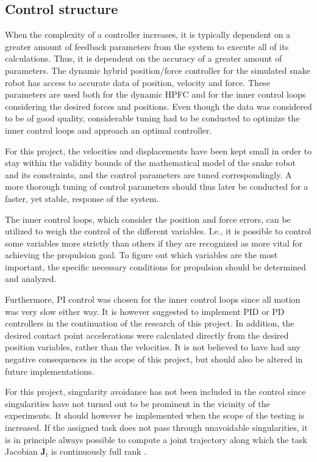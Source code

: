 \subsection{Control structure}

When the complexity of a controller increases, it is typically dependent on a greater amount of feedback parameters from the system to execute all of its calculations. Thus, it is dependent on the accuracy of a greater amount of parameters. The dynamic hybrid position/force controller for the simulated snake robot has access to accurate data of position, velocity and force. These parameters are used both for the dynamic HPFC and for the inner control loops considering the desired forces and positions. Even though the data was considered to be of good quality, considerable tuning had to be conducted to optimize the inner control loops and approach an optimal controller. 

For this project, the velocities and displacements have been kept small in order to stay within the validity bounds of the mathematical model of the snake robot and its constraints, and the control parameters are tuned correspondingly. A more thorough tuning of control parameters should thus later be conducted for a faster, yet stable, response of the system.

The inner control loops, which consider the position and force errors, can be utilized to weigh the control of the different variables. I.e., it is possible to control some variables more strictly than others if they are recognized as more vital for achieving the propulsion goal. To figure out which variables are the most important, the specific necessary conditions for propulsion should be determined and analyzed.

Furthermore, PI control was chosen for the inner control loops since all motion was very slow either way. It is however suggested to implement PID or PD controllers in the continuation of the research of this project. In addition, the desired contact point accelerations were calculated directly from the desired position variables, rather than the velocities. It is not believed to have had any negative consequences in the scope of this project, but should also be altered in future implementations.

For this project, singularity avoidance has not been included in the control since singularities have not turned out to be prominent in the vicinity of the experiments. It should however be implemented when the scope of the testing is increased. If the assigned task does not pass through unavoidable singularities, it is in principle always possible to compute a joint trajectory along which the task Jacobian $\mathbf{J}_t$ is continuously full rank \cite{chiaverini2008kinematically}.

